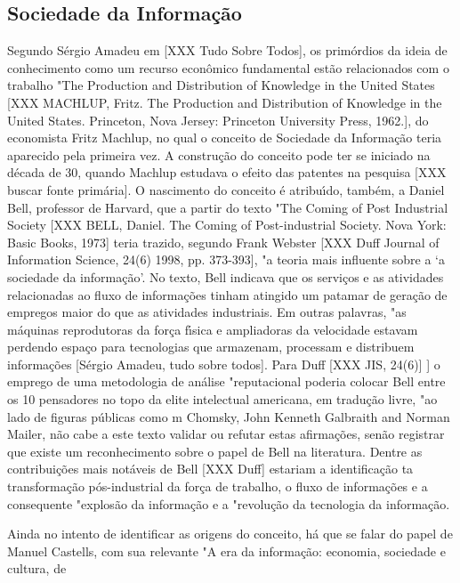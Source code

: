 \documentclass[
12pt,		%
openright,	%
twoside,  %
a4paper,			%
chapter=TITLE,		%
english,			%
french,				%
spanish,			%
brazil				%
]{USPSC-classe/USPSC}
\begin{document}
\subsection[Sociedade da Informa\c{c}\~ao]{Sociedade da Informa\c{c}\~ao}\label{Sociedade da Informa\c{c}\~ao}
Segundo S\'ergio Amadeu em [XXX Tudo Sobre Todos], os prim\'ordios da ideia de conhecimento como um recurso econ\^omico fundamental est\~ao relacionados com o trabalho "The Production and Distribution of Knowledge in the United States [XXX MACHLUP, Fritz. The Production and Distribution of Knowledge in the United States. Princeton, Nova Jersey: Princeton University Press, 1962.], do economista Fritz Machlup, no qual o conceito de Sociedade da Informa\c{c}\~ao teria aparecido pela primeira vez. A constru\c{c}\~ao do conceito pode ter se iniciado na d\'ecada de 30, quando Machlup estudava o efeito das patentes na pesquisa [XXX buscar fonte prim\'aria]. O nascimento do conceito \'e atribu\'{\i}do, tamb\'em, a Daniel Bell, professor de Harvard, que a partir do texto "The Coming of Post Industrial Society [XXX BELL, Daniel. The Coming of Post-industrial Society. Nova York: Basic Books, 1973] teria trazido, segundo Frank Webster [XXX Duff Journal of Information Science, 24(6) 1998, pp. 373-393], "a teoria mais influente sobre a ‘a sociedade da informa\c{c}\~ao’. No texto, Bell indicava que os servi\c{c}os e as atividades relacionadas ao fluxo de informa\c{c}\~oes tinham atingido um patamar de gera\c{c}\~ao de empregos maior do que as atividades industriais. Em outras palavras, "as m\'aquinas reprodutoras da for\c{c}a f\'{\i}sica e ampliadoras da velocidade estavam perdendo espa\c{c}o para tecnologias que armazenam, processam e distribuem informa\c{c}\~oes [S\'ergio Amadeu, tudo sobre todos]. Para Duff [XXX JIS, 24(6)] ] o emprego de uma metodologia de an\'alise "reputacional poderia colocar Bell entre os 10 pensadores no topo da elite intelectual americana, em tradu\c{c}\~ao livre, "ao lado de figuras p\'ublicas como m Chomsky, John Kenneth Galbraith and Norman Mailer, n\~ao cabe a este texto validar ou refutar estas afirma\c{c}\~oes, sen\~ao registrar que existe um reconhecimento sobre o papel de Bell na literatura. Dentre as contribui\c{c}\~oes mais not\'aveis de Bell [XXX Duff] estariam a identifica\c{c}\~ao ta transforma\c{c}\~ao p\'os-industrial da for\c{c}a de trabalho, o fluxo de informa\c{c}\~oes e a consequente "explos\~ao da informa\c{c}\~ao e a "revolu\c{c}\~ao da tecnologia da informa\c{c}\~ao. 


Ainda no intento de identificar as origens do conceito, h\'a que se falar do papel de Manuel Castells, com sua relevante "A era da informa\c{c}\~ao: economia, sociedade e cultura, de 
\end{document}
